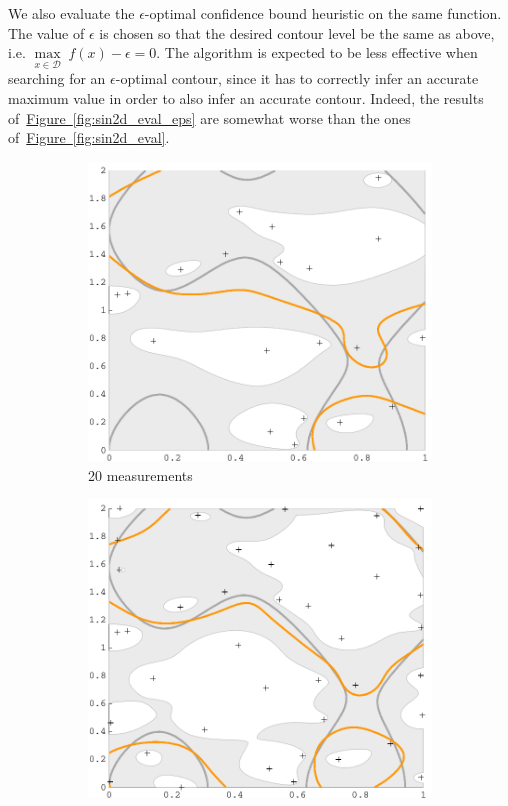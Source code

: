 \documentclass[11pt]{article} %
\newcommand{\figref}[1]{\hyperref[#1]{\mbox{Figure~\ref*{#1}}}}
\begin{document}
We also evaluate the $\epsilon$-optimal confidence bound heuristic on the same
function. The value of $\epsilon$ is chosen so that the desired contour
level be the same as above, i.e.
${\underset{x\in\mathcal{D}}{\max}\;f(x) - \epsilon = 0}$. The algorithm is
expected
to be less effective when searching for an $\epsilon$-optimal contour, since
it has to correctly infer an accurate maximum value in order to also infer
an accurate contour. Indeed, the results of~\figref{fig:sin2d_eval_eps} are
somewhat worse than the ones of~\figref{fig:sin2d_eval}.

\begin{figure}[tb]
  \begin{subfigure}[b]{0.5\textwidth}
    \centering
    \includegraphics[width=\textwidth]{figures/sin2d_20}
    \caption{20 measurements}
  \end{subfigure}
  \hfill
  \begin{subfigure}[b]{0.5\textwidth}
    \centering
    \includegraphics[width=\textwidth]{figures/sin2d_40}

\end{subfigure}
\end{figure}
\end{document}
